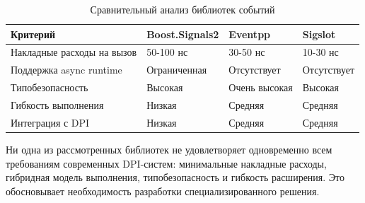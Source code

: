 \begin{table}[H]
\centering
\caption{Сравнительный анализ библиотек событий}
\label{tab:libs_comparison}
\begin{tabularx}{\textwidth}{lXXX}
\toprule
\textbf{Критерий} & \textbf{Boost.Signals2} & \textbf{Eventpp} & \textbf{Sigslot} \\
\midrule
Накладные расходы на вызов & 50-100 нс & 30-50 нс & 10-30 нс \\
Поддержка async runtime & Ограниченная & Отсутствует & Отсутствует \\
Типобезопасность & Высокая & Очень высокая & Высокая \\
Гибкость выполнения & Низкая & Средняя & Средняя \\
Интеграция с DPI & Низкая & Средняя & Средняя \\
\bottomrule
\end{tabularx}
\end{table}

Ни одна из рассмотренных библиотек не удовлетворяет одновременно всем требованиям современных DPI-систем: минимальные накладные расходы, гибридная модель выполнения, типобезопасность и гибкость расширения.
Это обосновывает необходимость разработки специализированного решения.

\newpage